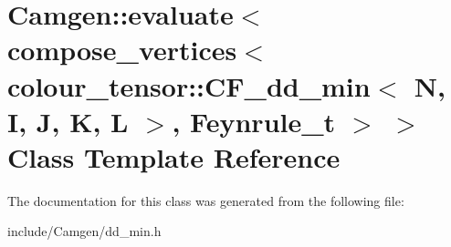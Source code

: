 \hypertarget{a00156}{}\section{Camgen\+:\+:evaluate$<$ compose\+\_\+vertices$<$ colour\+\_\+tensor\+:\+:C\+F\+\_\+dd\+\_\+min$<$ N, I, J, K, L $>$, Feynrule\+\_\+t $>$ $>$ Class Template Reference}
\label{a00156}


The documentation for this class was generated from the following file\+:\begin{DoxyCompactItemize}
\item 
include/\+Camgen/dd\+\_\+min.\+h\end{DoxyCompactItemize}
